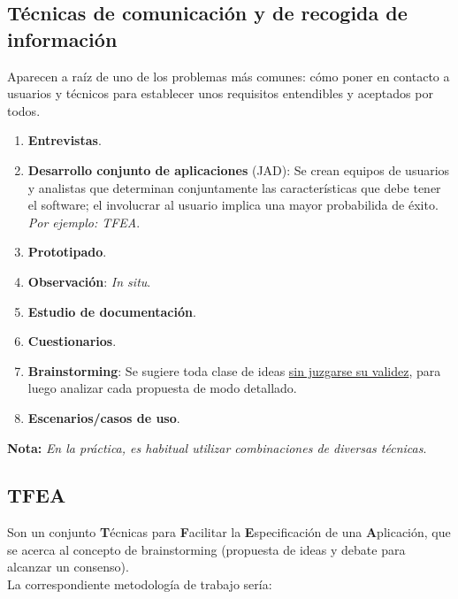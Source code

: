 \subsection{Técnicas de comunicación y de recogida de información}

Aparecen a raíz de uno de los problemas más comunes: cómo poner en contacto a usuarios y técnicos para establecer unos requisitos entendibles y aceptados por todos.

\begin{enumerate} %
    \item \textbf{Entrevistas}.
    \item \textbf{Desarrollo conjunto de aplicaciones} (JAD): Se crean equipos de usuarios y analistas que determinan conjuntamente las características que debe tener el software; el involucrar al usuario implica una mayor probabilida de éxito. \textit{Por ejemplo: TFEA}.
    \item \textbf{Prototipado}.
    \item \textbf{Observación}: \textit{In situ}.
    \item \textbf{Estudio de documentación}.
    \item \textbf{Cuestionarios}.
    \item \textbf{Brainstorming}: Se sugiere toda clase de ideas \uline{sin juzgarse su validez}, para luego analizar cada propuesta de modo detallado.
    \item \textbf{Escenarios/casos de uso}.
\end{enumerate}

\textbf{Nota:} \textit{En la práctica, es habitual utilizar combinaciones de diversas técnicas}.

\subsection{TFEA}

Son un conjunto \textbf{T}écnicas para \textbf{F}acilitar la \textbf{E}specificación de una \textbf{A}plicación, que se acerca al concepto de brainstorming (propuesta de ideas y debate para alcanzar un consenso).\\

La correspondiente metodología de trabajo sería:

